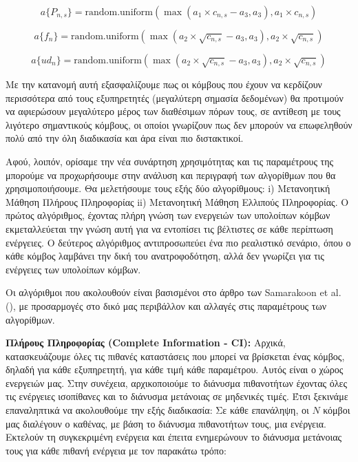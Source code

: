 \[a\{P_{n,s}\} = \text{random.uniform}\left(\max\left(a_1 \times c_{n,s} - a_3, a_3\right), a_1 \times c_{n,s}\right)\]

\[a\{f_n\} = \text{random.uniform}\left(\max\left(a_2 \times \sqrt{c_{n,s}} - a_3, a_3\right), a_2 \times \sqrt{c_{n,s}}\right)\]

\[a\{ud_n\} = \text{random.uniform}\left(\max\left(a_2 \times \sqrt{c_{n,s}} - a_3, a_3\right), a_2 \times \sqrt{c_{n,s}}\right)\]

\noindent
Με την κατανομή αυτή εξασφαλίζουμε πως οι κόμβους που έχουν να κερδίζουν περισσότερα από τους εξυπηρετητές (μεγαλύτερη σημασία δεδομένων) θα προτιμούν να αφιερώσουν μεγαλύτερο μέρος των διαθέσιμων πόρων τους, σε αντίθεση με τους λιγότερο σημαντικούς κόμβους, οι οποίοι γνωρίζουν πως δεν μπορούν να επωφεληθούν πολύ από την όλη διαδικασία και άρα είναι πιο διστακτικοί.

Αφού, λοιπόν, ορίσαμε την νέα συνάρτηση χρησιμότητας και τις παραμέτρους της μπορούμε να προχωρήσουμε στην ανάλυση και περιγραφή των αλγορίθμων που θα χρησιμοποιήσουμε. Θα μελετήσουμε τους εξής δύο αλγορίθμους: i) Μετανοητική Μάθηση Πλήρους Πληροφορίας ii) Μετανοητική Μάθηση Ελλιπούς Πληροφορίας. Ο πρώτος αλγόριθμος, έχοντας πλήρη γνώση των ενεργειών των υπολοίπων κόμβων εκμεταλλεύεται την γνώση αυτή για να εντοπίσει τις βέλτιστες σε κάθε περίπτωση ενέργειες. Ο δεύτερος αλγόριθμος αντιπροσωπεύει ένα πιο ρεαλιστικό σενάριο, όπου ο κάθε κόμβος λαμβάνει την δική του ανατροφοδότηση, αλλά δεν γνωρίζει για τις ενέργειες των υπολοίπων κόμβων.

Οι αλγόριθμοι που ακολουθούν είναι βασισμένοι στο άρθρο των Samarakoon et al. (), με προσαρμογές στο δικό μας περιβάλλον και αλλαγές στις παραμέτρους των αλγορίθμων.

\textbf{Πλήρους Πληροφορίας (Complete Information - CI):} Αρχικά, κατασκευάζουμε όλες τις πιθανές καταστάσεις που μπορεί να βρίσκεται ένας κόμβος, δηλαδή για κάθε εξυπηρετητή, για κάθε τιμή κάθε παραμέτρου. Αυτός είναι ο χώρος ενεργειών μας. Στην συνέχεια, αρχικοποιούμε το διάνυσμα πιθανοτήτων έχοντας όλες τις ενέργειες ισοπίθανες και το διάνυσμα μετάνοιας σε μηδενικές τιμές. Έτσι ξεκινάμε επαναληπτικά να ακολουθούμε την εξής διαδικασία: Σε κάθε επανάληψη, οι $N$ κόμβοι μας διαλέγουν ο καθένας, με βάση το διάνυσμα πιθανοτήτων τους, μια ενέργεια. Εκτελούν τη συγκεκριμένη ενέργεια και έπειτα ενημερώνουν το διάνυσμα μετάνοιας τους για κάθε πιθανή ενέργεια με τον παρακάτω τρόπο:

\vspace{-5pt}

